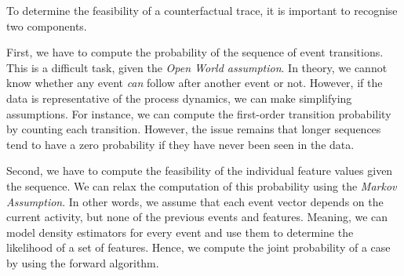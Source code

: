 \documentclass[./../../paper.tex]{subfiles}
\begin{document}
To determine the feasibility of a counterfactual trace, it is important to recognise two components. 

First, we have to compute the probability of the sequence of event transitions. This is a difficult task, given the \emph{Open World assumption}. In theory, we cannot know whether any event \emph{can} follow after another event or not. However, if the data is representative of the process dynamics, we can make simplifying assumptions. For instance, we can compute the first-order transition probability by counting each transition. However, the issue remains that longer sequences tend to have a zero probability if they have never been seen in the data. %

Second, we have to compute the feasibility of the individual feature values given the sequence. We can relax the computation of this probability using the \emph{Markov Assumption}. In other words, we assume that each event vector depends on the current activity, but none of the previous events and features. Meaning, we can model density estimators for every event and use them to determine the likelihood of a set of features. Hence, we compute the joint probability of a case by using the forward algorithm. 



\end{document}
